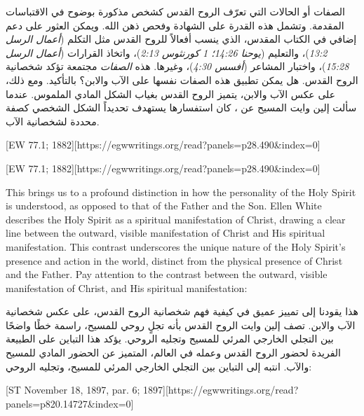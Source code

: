 الصفات أو الحالات التي تعرّف الروح القدس كشخص مذكورة بوضوح في الاقتباسات المقدمة. وتشمل هذه القدرة على الشهادة وفحص ذهن الله. ويمكن العثور على دعم إضافي في الكتاب المقدس، الذي ينسب أفعالاً للروح القدس مثل التكلم (\textit{أعمال الرسل 13:2})، والتعليم (\textit{يوحنا 14:26؛ 1 كورنثوس 2:13})، واتخاذ القرارات (\textit{أعمال الرسل 15:28})، واختبار المشاعر (\textit{أفسس 4:30})، وغيرها. هذه \textit{الصفات} مجتمعة تؤكد شخصانية الروح القدس. هل يمكن تطبيق هذه الصفات نفسها على الآب والابن؟ بالتأكيد. ومع ذلك، على عكس الآب والابن، يتميز الروح القدس بغياب الشكل المادي الملموس. عندما سألت إلين وايت المسيح عن ، كان استفسارها يستهدف تحديداً الشكل الشخصي كصفة محددة لشخصانية الآب.


[EW 77.1; 1882][https://egwwritings.org/read?panels=p28.490&index=0]


[EW 77.1; 1882][https://egwwritings.org/read?panels=p28.490&index=0]


This brings us to a profound distinction in how the personality of the Holy Spirit is understood, as opposed to that of the Father and the Son. Ellen White describes the Holy Spirit as a spiritual manifestation of Christ, drawing a clear line between the outward, visible manifestation of Christ and His spiritual manifestation. This contrast underscores the unique nature of the Holy Spirit's presence and action in the world, distinct from the physical presence of Christ and the Father. Pay attention to the contrast between the outward, visible manifestation of Christ, and His spiritual manifestation:


هذا يقودنا إلى تمييز عميق في كيفية فهم شخصانية الروح القدس، على عكس شخصانية الآب والابن. تصف إلين وايت الروح القدس بأنه تجلٍ روحي للمسيح، راسمة خطًا واضحًا بين التجلي الخارجي المرئي للمسيح وتجليه الروحي. يؤكد هذا التباين على الطبيعة الفريدة لحضور الروح القدس وعمله في العالم، المتميز عن الحضور المادي للمسيح والآب. انتبه إلى التباين بين التجلي الخارجي المرئي للمسيح، وتجليه الروحي:


[ST November 18, 1897, par. 6; 1897][https://egwwritings.org/read?panels=p820.14727&index=0]


